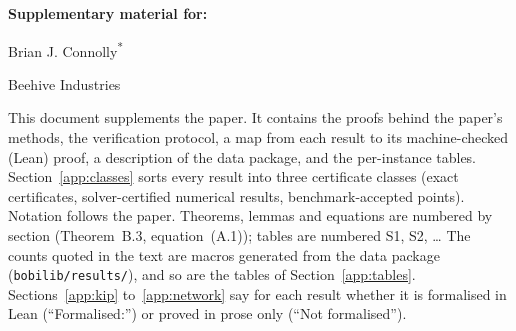 \documentclass[11pt,letterpaper]{article}
\numberwithin{equation}{section}
\theoremstyle{definition}
\theoremstyle{remark}
\begin{document}
\begin{center}
{\Large\bfseries Supplementary material for:\\[2pt] \papertitle\par}
\vspace{14pt}
{\large Brian J. Connolly\textsuperscript{*}\par}
\vspace{4pt}
Beehive Industries\par
\end{center}
{\renewcommand{\thefootnote}{\fnsymbol{footnote}}%
}
\vspace{6pt}

\noindent This document supplements the paper. It contains the proofs behind
the paper's methods, the verification protocol, a map from each result to its
machine-checked (Lean) proof, a description of the data package, and the
per-instance tables. Section~\ref{app:classes} sorts every result into
three certificate classes (exact certificates, solver-certified numerical
results, benchmark-accepted points). Notation follows the paper. Theorems, lemmas and
equations are numbered by section (Theorem~B.3, equation~(A.1)); tables are
numbered S1, S2, \dots{} The counts quoted in the text are macros
generated from the data package (\texttt{bobilib/results/}), and so are the
tables of Section~\ref{app:tables}. Sections~\ref{app:kip} to~\ref{app:network} say for
each result whether it is formalised in Lean (``Formalised:'') or proved in
prose only (``Not formalised'').

{\small\tableofcontents}














\end{document}
